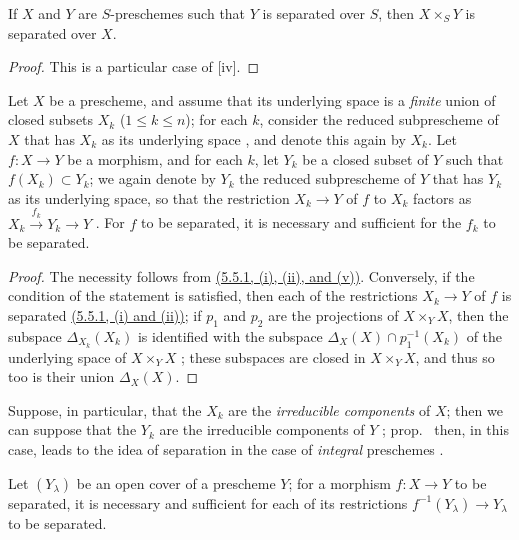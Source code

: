 \begin{cor}[5.5.3]
\label{1.5.5.3}
If $X$ and $Y$ are $S$-preschemes such that $Y$ is separated over $S$, then $X\times_S Y$ is separated over $X$.
\end{cor}

\begin{proof}
\label{proof-1.5.5.3}
This is a particular case of [iv].
\end{proof}

\begin{prop}[5.5.4]
\label{1.5.5.4}
Let $X$ be a prescheme, and assume that its underlying space is a \emph{finite} union of closed subsets $X_k$ ($1\leqslant k\leqslant n$);
for each $k$, consider the reduced subprescheme of $X$ that has $X_k$ as its underlying space , and denote this again by $X_k$.
Let $f:X\to Y$ be a morphism, and for each $k$, let $Y_k$ be a closed subset of $Y$ such that $f(X_k)\subset Y_k$;
we again denote by $Y_k$ the reduced subprescheme of $Y$ that has $Y_k$ as its underlying space, so that the restriction $X_k\to Y$ of $f$ to $X_k$ factors as $X_k\xrightarrow{f_k}Y_k\to Y$ .
For $f$ to be separated, it is necessary and sufficient for the $f_k$ to be separated.
\end{prop}

\begin{proof}
\label{proof-1.5.5.4}
The necessity follows from \hyperref[1.5.5.1]{(5.5.1, (i), (ii), and (v))}.
Conversely, if the condition of the statement is satisfied, then each of the restrictions $X_k\to Y$ of $f$ is separated \hyperref[1.5.5.1]{(5.5.1, (i) and (ii))};
if $p_1$ and $p_2$ are the projections of $X\times_Y X$, then the subspace $\Delta_{X_k}(X_k)$ is identified with the subspace $\Delta_X(X)\cap p_1^{-1}(X_k)$ of the underlying space of $X\times_Y X$ ;
these subspaces are closed in $X\times_Y X$, and thus so too is their union $\Delta_X(X)$.
\end{proof}

Suppose, in particular, that the $X_k$ are the \emph{irreducible components} of $X$;
then we can suppose that the $Y_k$ are the irreducible components of $Y$ ;
prop.~ then, in this case, leads to the idea of separation in the case of \emph{integral} preschemes .

\begin{prop}[5.5.5]
\label{1.5.5.5}
Let $(Y_\lambda)$ be an open cover of a prescheme $Y$;
for a morphism $f:X\to Y$ to be separated, it is necessary and sufficient for each of its restrictions $f^{-1}(Y_\lambda)\to Y_\lambda$ to be separated.
\end{prop}

